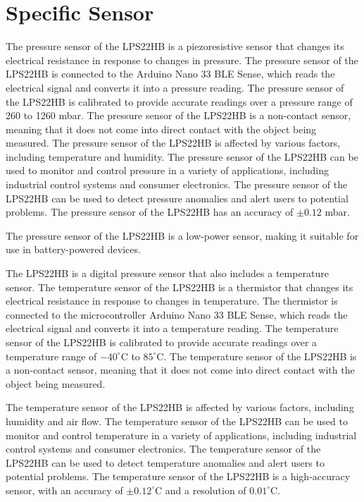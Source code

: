 
\section{Specific Sensor}

The pressure sensor of the LPS22HB is a piezoresistive sensor that changes its electrical resistance in response to changes in pressure. The pressure sensor of the LPS22HB is connected to the Arduino Nano 33 BLE Sense, which reads the electrical signal and converts it into a pressure reading. The pressure sensor of the LPS22HB is calibrated to provide accurate readings over a pressure range of 260 to 1260 mbar. The pressure sensor of the LPS22HB is a non-contact sensor, meaning that it does not come into direct contact with the object being measured. The pressure sensor of the LPS22HB is affected by various factors, including temperature and humidity. The pressure sensor of the LPS22HB can be used to monitor and control pressure in a variety of applications, including industrial control systems and consumer electronics. The pressure sensor of the LPS22HB can be used to detect pressure anomalies and alert users to potential problems. The pressure sensor of the LPS22HB has an accuracy of $\pm0.12$ mbar. 

The pressure sensor of the LPS22HB is a low-power sensor, making it suitable for use in battery-powered devices. 

\bigskip

The LPS22HB is a digital pressure sensor that also includes a temperature sensor. The temperature sensor of the LPS22HB is a thermistor that changes its electrical resistance in response to changes in temperature. The thermistor is connected to the  microcontroller Arduino Nano 33 BLE Sense, which reads the electrical signal and converts it into a temperature reading. The temperature sensor of the LPS22HB is calibrated to provide accurate readings over a temperature range of $-40^\circ$C to $85^\circ$C. The temperature sensor of the LPS22HB is a non-contact sensor, meaning that it does not come into direct contact with the object being measured. 

The temperature sensor of the LPS22HB is affected by various factors, including humidity and air flow. The temperature sensor of the LPS22HB can be used to monitor and control temperature in a variety of applications, including industrial control systems and consumer electronics. The temperature sensor of the LPS22HB can be used to detect temperature anomalies and alert users to potential problems. The temperature sensor of the LPS22HB is a high-accuracy sensor, with an accuracy of $\pm0.12^\circ$C and a resolution of $0.01^\circ$C. 

